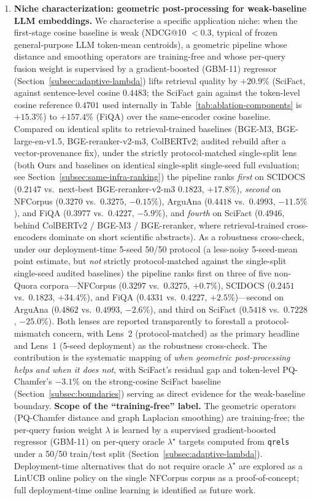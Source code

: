 \documentclass[review,1p]{elsarticle}
\begin{document}
\begin{enumerate}[leftmargin=*]
\item \textbf{Niche characterization: geometric post-processing for weak-baseline LLM embeddings.} We characterise a specific application niche: when the first-stage cosine baseline is weak (NDCG@10 $<0.3$, typical of frozen general-purpose LLM token-mean centroids), a geometric pipeline whose distance and smoothing operators are training-free and whose per-query fusion weight is supervised by a gradient-boosted (GBM-11) regressor (Section~\ref{subsec:adaptive-lambda}) lifts retrieval quality by $+20.9\%$ (SciFact, against sentence-level cosine $0.4483$; the SciFact gain against the token-level cosine reference $0.4701$ used internally in Table~\ref{tab:ablation-components} is $+15.3\%$) to $+157.4\%$ (FiQA) over the same-encoder cosine baseline. Compared on identical splits to retrieval-trained baselines (BGE-M3, BGE-large-en-v1.5, BGE-reranker-v2-m3, ColBERTv2; audited rebuild after a vector-provenance fix), under the strictly protocol-matched single-split lens (both Ours and baselines on identical single-split single-seed full evaluation; see Section~\ref{subsec:same-infra-ranking}) the pipeline ranks \emph{first} on SCIDOCS ($0.2147$ vs.\ next-best BGE-reranker-v2-m3 $0.1823$, $+17.8\%$), \emph{second} on NFCorpus ($0.3270$ vs.\ $0.3275$, $-0.15\%$), ArguAna ($0.4418$ vs.\ $0.4993$, $-11.5\%$), and FiQA ($0.3977$ vs.\ $0.4227$, $-5.9\%$), and \emph{fourth} on SciFact ($0.4946$, behind ColBERTv2 / BGE-M3 / BGE-reranker, where retrieval-trained cross-encoders dominate on short scientific abstracts). As a robustness cross-check, under our deployment-time 5-seed 50/50 protocol (a less-noisy 5-seed-mean point estimate, but \emph{not} strictly protocol-matched against the single-split single-seed audited baselines) the pipeline ranks first on three of five non-Quora corpora---NFCorpus ($0.3297$ vs.\ $0.3275$, $+0.7\%$), SCIDOCS ($0.2451$ vs.\ $0.1823$, $+34.4\%$), and FiQA ($0.4331$ vs.\ $0.4227$, $+2.5\%$)---second on ArguAna ($0.4862$ vs.\ $0.4993$, $-2.6\%$), and third on SciFact ($0.5418$ vs.\ $0.7228$, $-25.0\%$). Both lenses are reported transparently to forestall a protocol-mismatch concern, with Lens~2 (protocol-matched) as the primary headline and Lens~1 (5-seed deployment) as the robustness cross-check. The contribution is the systematic mapping of \emph{when geometric post-processing helps and when it does not}, with SciFact's residual gap and token-level PQ-Chamfer's $-3.1\%$ on the strong-cosine SciFact baseline (Section~\ref{subsec:boundaries}) serving as direct evidence for the weak-baseline boundary. \textbf{Scope of the ``training-free'' label.} The geometric operators (PQ-Chamfer distance and graph Laplacian smoothing) are training-free; the per-query fusion weight $\lambda$ is learned by a supervised gradient-boosted regressor (GBM-11) on per-query oracle $\lambda^\star$ targets computed from \texttt{qrels} under a 50/50 train/test split (Section~\ref{subsec:adaptive-lambda}). Deployment-time alternatives that do not require oracle $\lambda^\star$ are explored as a LinUCB online policy on the single NFCorpus corpus as a proof-of-concept; full deployment-time online learning is identified as future work.


\end{enumerate}
\end{document}
